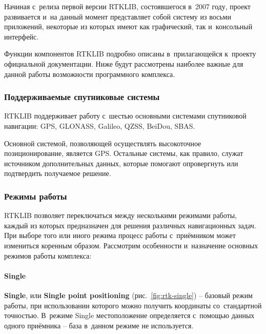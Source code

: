 Начиная с~релиза первой версии RTKLIB, состоявшегося в~2007 году, проект развивается и~на данный момент представляет собой систему из восьми приложений, некоторые из которых имеют как графический, так и~консольный интерфейс.

Функции компонентов RTKLIB подробно описаны в~прилагающейся к~проекту официальной документации. Ниже будут рассмотрены наиболее важные для данной работы возможности программного комплекса.

\subsubsection{Поддерживаемые спутниковые системы}
\label{subsec:rtklib-supported-gnss}

RTKLIB поддерживает работу с~шестью основными системами спутниковой навигации: GPS, GLONASS, Galileo, QZSS, BeiDou, SBAS.

Основной системой, позволяющей осуществлять высокоточное позиционирование, является GPS. Остальные системы, как правило, служат источником дополнительных данных, которые помогают опровергнуть или подтвердить получаемое решение.

\subsubsection{Режимы работы}
\label{subsec:rtklib-modes}

RTKLIB позволяет переключаться между несколькими режимами работы, каждый из которых предназначен для решения различных навигационных задач. При выборе того или иного режима процесс работы с~приёмником может измениться коренным образом. Рассмотрим особенности и~назначение основных режимов работы комплекса:

\paragraph{Single}

\textbf{Single}, или \textbf{Single point positioning} (рис.~\ref{fig:rtk-single}) -- базовый режим работы, при использовании которого можно получить координаты со~стандартной точностью. В~режиме Single местоположение определяется с~помощью данных одного приёмника -- база в~данном режиме не используется.

